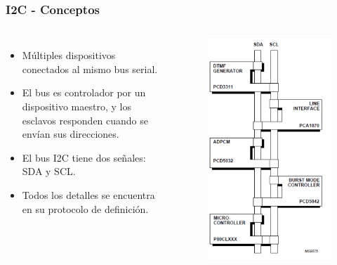 \documentclass[10.5pt,scale=1.0,t,aspectratio=169,hyperref={pdfpagelabels=false}]{beamer}
\begin{document}
\begin{frame}
	\frametitle{I2C - Conceptos}
	{\small
		
		\begin{columns}
			\begin{itemize}
				\item Múltiples dispositivos conectados al mismo bus serial.
				\item El bus es controlador por un dispositivo maestro, y los esclavos responden cuando se envían sus direcciones. 
				\item El bus I2C tiene dos señales: SDA y SCL.
				\item Todos los detalles se encuentra en su protocolo de definición. 
			\end{itemize}
			
			
			\begin{figure}
				\centering
				\includegraphics[scale=0.25]{21_I2CBus}
			\end{figure}
			
		\end{columns}
	}
\end{frame}
\end{document}
